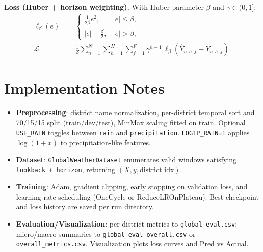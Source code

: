 \documentclass[12pt,a4paper]{article}
\begin{document}
\noindent\textbf{Loss (Huber + horizon weighting).} With Huber parameter $\beta$ and $\gamma\in(0,1]$:
\begin{align*}
\ell_{\beta}(e) &= \begin{cases} \tfrac{1}{2\beta} e^2, & |e|\le \beta,\\ |e| - \tfrac{\beta}{2}, & |e|>\beta, \end{cases}\\
\mathcal{L} &= \frac{1}{Z} \sum_{n=1}^{N} \sum_{h=1}^{H} \sum_{f=1}^{F} \gamma^{h-1}\, \ell_{\beta}\!\left( \widehat{Y}_{n,h,f} - Y_{n,h,f} \right).
\end{align*}

\section{Implementation Notes}
\begin{itemize}
    \item \textbf{Preprocessing}: district name normalization, per-district temporal sort and 70/15/15 split (train/dev/test), MinMax scaling fitted on train. Optional \texttt{USE\_RAIN} toggles between \texttt{rain} and \texttt{precipitation}. \texttt{LOG1P\_RAIN=1} applies $\log(1+x)$ to precipitation-like features.
    \item \textbf{Dataset}: \texttt{GlobalWeatherDataset} enumerates valid windows satisfying \texttt{lookback + horizon}, returning $(X, y, \text{district\_idx})$.
    \item \textbf{Training}: Adam, gradient clipping, early stopping on validation loss, and learning-rate scheduling (OneCycle or ReduceLROnPlateau). Best checkpoint and loss history are saved per run directory.
    \item \textbf{Evaluation/Visualization}: per-district metrics to \texttt{global\_eval.csv}; micro/macro summaries to \texttt{global\_eval\_overall.csv} or \texttt{overall\_metrics.csv}. Visualization plots loss curves and Pred vs Actual.
\end{itemize}
\end{document}
